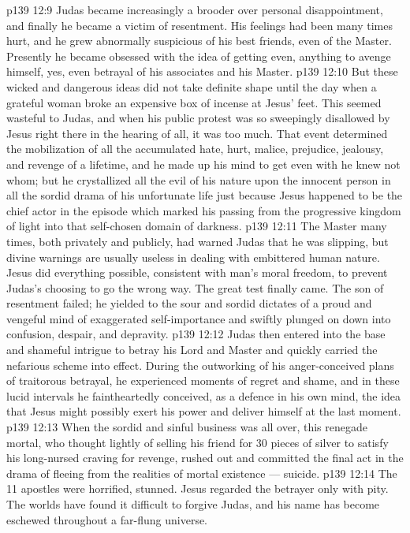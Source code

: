 \vs p139 12:9 \pc Judas became increasingly a brooder over personal disappointment, and finally he became a victim of resentment. His feelings had been many times hurt, and he grew abnormally suspicious of his best friends, even of the Master. Presently he became obsessed with the idea of getting even, anything to avenge himself, yes, even betrayal of his associates and his Master.
\vs p139 12:10 But these wicked and dangerous ideas did not take definite shape until the day when a grateful woman broke an expensive box of incense at Jesus’ feet. This seemed wasteful to Judas, and when his public protest was so sweepingly disallowed by Jesus right there in the hearing of all, it was too much. That event determined the mobilization of all the accumulated hate, hurt, malice, prejudice, jealousy, and revenge of a lifetime, and he made up his mind to get even with he knew not whom; but he crystallized all the evil of his nature upon the  innocent person in all the sordid drama of his unfortunate life just because Jesus happened to be the chief actor in the episode which marked his passing from the progressive kingdom of light into that self\hyp{}chosen domain of darkness.
\vs p139 12:11 The Master many times, both privately and publicly, had warned Judas that he was slipping, but divine warnings are usually useless in dealing with embittered human nature. Jesus did everything possible, consistent with man’s moral freedom, to prevent Judas’s choosing to go the wrong way. The great test finally came. The son of resentment failed; he yielded to the sour and sordid dictates of a proud and vengeful mind of exaggerated self\hyp{}importance and swiftly plunged on down into confusion, despair, and depravity.
\vs p139 12:12 Judas then entered into the base and shameful intrigue to betray his Lord and Master and quickly carried the nefarious scheme into effect. During the outworking of his anger\hyp{}conceived plans of traitorous betrayal, he experienced moments of regret and shame, and in these lucid intervals he faintheartedly conceived, as a defence in his own mind, the idea that Jesus might possibly exert his power and deliver himself at the last moment.
\vs p139 12:13 When the sordid and sinful business was all over, this renegade mortal, who thought lightly of selling his friend for 30 pieces of silver to satisfy his long\hyp{}nursed craving for revenge, rushed out and committed the final act in the drama of fleeing from the realities of mortal existence --- suicide.
\vs p139 12:14 The 11 apostles were horrified, stunned. Jesus regarded the betrayer only with pity. The worlds have found it difficult to forgive Judas, and his name has become eschewed throughout a far\hyp{}flung universe.
\quizlink
